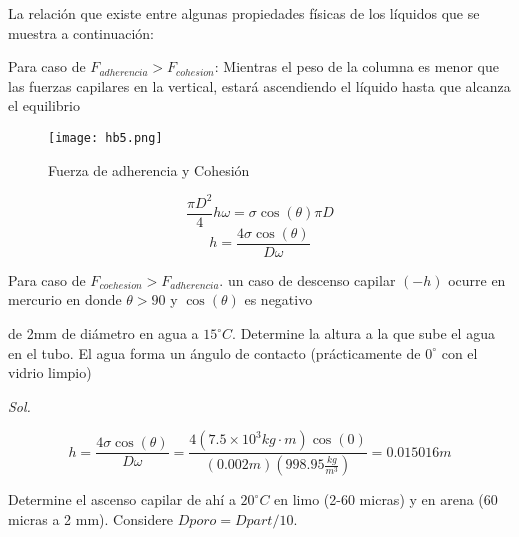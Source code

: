 La relación que existe entre algunas propiedades físicas de los líquidos que se muestra a continuación: 

Para caso de $F_{adherencia} > F_{cohesion}$: Mientras el peso de la columna es menor que las fuerzas capilares en la vertical, estará ascendiendo el líquido hasta que alcanza el equilibrio

\begin{figure}[h!]
  \centerline{\texttt{[image: hb5.png]}}
  \caption{Fuerza de adherencia y Cohesión}
  \label{hb5}
\end{figure}

\begin{equation}
    \frac{\pi D^2}{4}h\omega=\sigma\cos{(\theta)}\pi D
\end{equation}
\begin{equation}
    h=\frac{4\sigma\cos{(\theta)}}{D\omega}
\end{equation}

Para caso de $F_{coehesion} > F_{adherencia}$. un caso de descenso capilar $(-h)$ ocurre en mercurio en donde $\theta>90$ y $\cos{(\theta)}$ es negativo

\begin{problem}
    de 2mm de diámetro en agua a $15^{\circ}C$. Determine la altura a la que sube el agua en el tubo. El agua forma un ángulo de contacto (prácticamente de $0^{\circ}$ con el vidrio limpio)
\end{problem}
\textit{ Sol. }

\begin{equation*}
    h=\frac{4\sigma\cos{(\theta)}}{D\omega}=\frac{4(7.5\times 10^{3}kg\cdot m)\cos{(0)}}{(0.002m)(998.95\frac{kg}{m^3})}=0.015016m
\end{equation*}

Determine el ascenso capilar de ahí a $20^{\circ}C$ en limo (2-60 micras) y en arena (60 micras a 2 mm).
Considere $Dporo=Dpart/10$.


